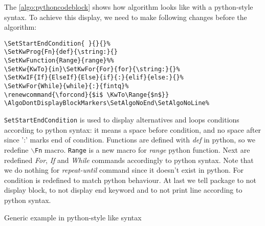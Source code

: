 \documentclass[a4paper]{article}
\begin{document}
The \autoref{algo:pythoncodeblock} shows how algorithm looks like with a python-style
syntax. To achieve this display, we need to make following changes before the algorithm:\vspace{-1.5ex}
\begin{verbatim}
\SetStartEndCondition{ }{}{}%
\SetKwProg{Fn}{def}{\string:}{}
\SetKwFunction{Range}{range}%%
\SetKw{KwTo}{in}\SetKwFor{For}{for}{\string:}{}%
\SetKwIF{If}{ElseIf}{Else}{if}{:}{elif}{else:}{}%
\SetKwFor{While}{while}{:}{fintq}%
\renewcommand{\forcond}{$i$ \KwTo\Range{$n$}}
\AlgoDontDisplayBlockMarkers\SetAlgoNoEnd\SetAlgoNoLine%
\end{verbatim}
\vspace{-1.5ex}\texttt{SetStartEndCondition} is used to display alternatives and loops
conditions according to python syntax: it means a space before condition, and no space
after since ':' marks end of condition. Functions are defined with \emph{def} in python,
so we redefine \texttt{$\backslash$Fn} macro. \texttt{Range} is a new macro for
\emph{range} python function. Next are redefined \emph{For}, \emph{If} and \emph{While}
commands accordingly to python syntax. Note that we do nothing for \emph{repeat-until}
command since it doesn't exist in python. For condition is redefined to match python
behaviour. At last we tell package to not display block, to
not display end keyword and to not print line according to python syntax.%
\renewcommand{\forcond}{$i$ \KwTo\Range{$n$}}
\begin{algorithm} \AlgoDontDisplayBlockMarkers\SetAlgoNoEnd\SetAlgoNoLine%
\SetStartEndCondition{ }{}{}%
%
%
%
%
%
  \caption{Generic example in python-style like syntax}\label{algo:pythoncodeblock}
  
\end{algorithm}
\end{document}
